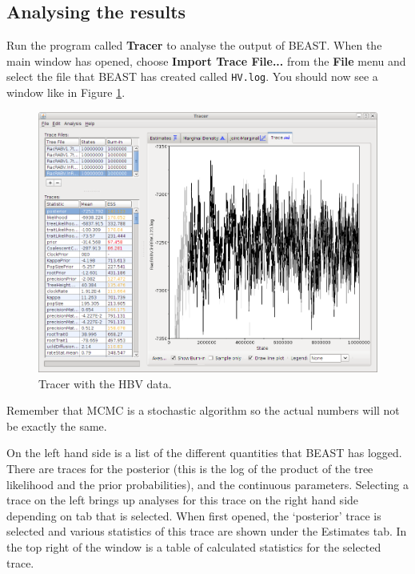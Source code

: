 \documentclass{article}
\begin{document}
\subsection*{Analysing the results}

Run the program called {\bf Tracer} to analyse the output of BEAST. When the main
window has opened, choose {\bf Import Trace File...} from the {\bf File} menu and select the file that
BEAST has created called \texttt{HV.log}.
You should now see a window like in Figure \ref{fig.tracer1}.

\begin{figure}
\begin{center}

\includegraphics[width=\textwidth]{figures/Tracer}

\end{center}
\caption{\label{fig.tracer1} Tracer with the HBV data.}
\end{figure}


Remember that MCMC is a stochastic algorithm so the actual numbers will not be exactly the same.

On the left hand side is a list of the different quantities that BEAST has logged. There are traces for the posterior (this
is the log of the product of the tree likelihood and the prior probabilities), and the continuous parameters. Selecting a trace
on the left brings up analyses for this trace on the right hand side depending on tab that is selected. When first opened, the
`posterior' trace is selected and various statistics of this trace are shown under the Estimates tab.
In the top right of the window is a table of calculated statistics for the selected trace. 
\end{document}
